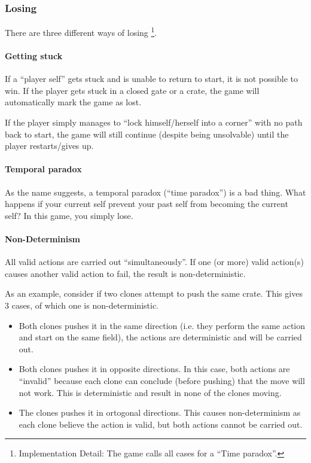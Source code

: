 
\subsubsection{Losing}

There are three different ways of losing
\footnote{Implementation Detail: The game calls all cases for a ``Time paradox''.}.

\paragraph{Getting stuck}
If a ``player self'' gets stuck and is unable to return to start, it
is not possible to win.  If the player gets stuck in a closed gate or
a crate, the game will automatically mark the game as lost.

If the player simply manages to ``lock himself/herself into a corner''
with no path back to start, the game will still continue (despite being
unsolvable) until the player restarts/gives up.

\paragraph{Temporal paradox}
\label{temporal-paradox}
As the name suggests, a temporal paradox (``time paradox'') is a bad
thing.  What happens if your current self prevent your past self from
becoming the current self?  In this game, you simply lose.

\paragraph{Non-Determinism}
All valid actions are carried out ``simultaneously''.  If one (or
more) valid action(s) causes another valid action to fail, the result
is non-deterministic.

As an example, consider if two clones attempt to push the same
crate.  This gives 3 cases, of which one is non-deterministic.

\begin{itemize}
\item Both clones pushes it in the same direction (i.e. they perform
  the same action and start on the same field), the actions are
  deterministic and will be carried out.
\item Both clones pushes it in opposite directions.  In this case,
  both actions are ``invalid'' because each clone can conclude (before
  pushing) that the move will not work.  This is deterministic and
  result in none of the clones moving.
\item The clones pushes it in ortogonal directions.  This causes
  non-determinism as each clone believe the action is valid, but
  both actions cannot be carried out.
\end{itemize}

